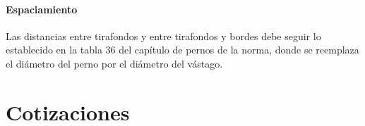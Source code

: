 \subsubsection{Espaciamiento}
Las distancias entre tirafondos y entre tirafondos y bordes debe seguir lo establecido en la tabla 36 del capítulo de pernos de la norma, donde se reemplaza el diámetro del perno por el diámetro del vástago.






\chapter{Cotizaciones}
